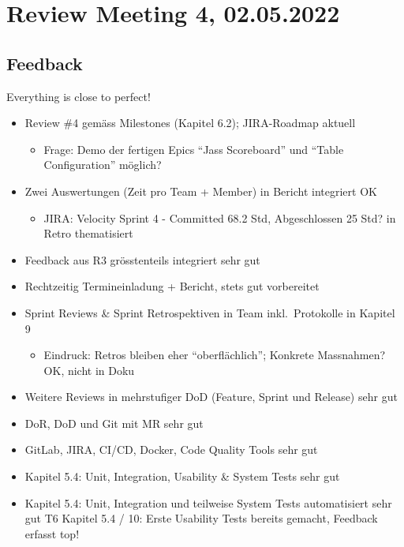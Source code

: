 \section{Review Meeting 4, 02.05.2022}

\subsection{Feedback}
Everything is close to perfect!

\begin{itemize}
    \item Review \#4 gemäss Milestones (Kapitel 6.2); JIRA-Roadmap aktuell
    \begin{itemize}
        \item Frage: Demo der fertigen Epics ``Jass Scoreboard'' und ``Table Configuration'' möglich?
    \end{itemize}
    \item Zwei Auswertungen (Zeit pro Team + Member) in Bericht integriert \textrightarrow OK
    \begin{itemize}
        \item JIRA: Velocity Sprint 4 - Committed 68.2 Std, Abgeschlossen 25 Std? \textrightarrow in Retro thematisiert
    \end{itemize}
    \item Feedback aus R3 grösstenteils integriert \textrightarrow sehr gut
    \item Rechtzeitig Termineinladung + Bericht, stets gut vorbereitet
    \item Sprint Reviews \& Sprint Retrospektiven in Team inkl.\ Protokolle in Kapitel 9
    \begin{itemize}
        \item Eindruck: Retros bleiben eher ``oberflächlich'';
        Konkrete Massnahmen? \textrightarrow OK, nicht in Doku
    \end{itemize}
    \item Weitere Reviews in mehrstufiger DoD (Feature, Sprint und Release) \textrightarrow sehr gut
    \item DoR, DoD und Git mit MR \textrightarrow sehr gut
    \item GitLab, JIRA, CI/CD, Docker, Code Quality Tools \textrightarrow sehr gut
    \item Kapitel 5.4: Unit, Integration, Usability \& System Tests \textrightarrow sehr gut
    \item Kapitel 5.4: Unit, Integration und teilweise System Tests automatisiert \textrightarrow sehr gut T6 Kapitel 5.4 / 10: Erste Usability Tests bereits gemacht, Feedback erfasst \textrightarrow top!

\end{itemize}
